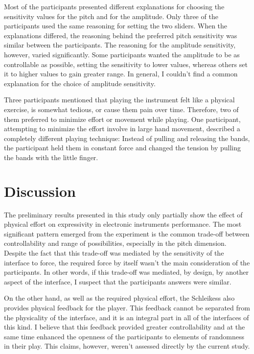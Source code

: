\documentclass{sigchi}
\begin{document}
Most of the participants presented different explanations for choosing the sensitivity values for the pitch and for the amplitude.
Only three of the participants used the same reasoning for setting the two sliders.
When the explanations differed, the reasoning behind the preferred pitch sensitivity was similar between the participants.
The reasoning for the amplitude sensitivity, however, varied significantly.
Some participants wanted the amplitude to be as controllable as possible, setting the sensitivity to lower values, whereas others set it to higher values to gain greater range.
In general, I couldn't find a common explanation for the choice of amplitude sensitivity.

Three participants mentioned that playing the instrument felt like a physical exercise, is somewhat tedious, or cause them pain over time.
Therefore, two of them preferred to minimize effort or movement while playing.
One participant, attempting to minimize the effort involve in large hand movement, described a completely different playing technique:
Instead of pulling and releasing the bands, the participant held them in constant force and changed the tension by pulling the bands with the little finger.

\section{Discussion}

The preliminary results presented in this study only partially show the effect of physical effort on expressivity in electronic instruments performance.
The most significant pattern emerged from the experiment is the common trade-off between controllability and range of possibilities, especially in the pitch dimension.
Despite the fact that this trade-off was mediated by the sensitivity of the interface to force, the required force by itself wasn't the main consideration of the participants.
In other words, if this trade-off was mediated, by design, by another aspect of the interface, I suspect that the participants answers were similar.

On the other hand, as well as the required physical effort, the Schleikess also provides physical feedback for the player.
This feedback cannot be separated from the physicality of the interface, and it is an integral part in all of the interfaces of this kind.
I believe that this feedback provided greater controllability and at the same time enhanced the openness of the participants to elements of randomness in their play.
This claims, however, weren't assessed directly by the current study.
\end{document}
